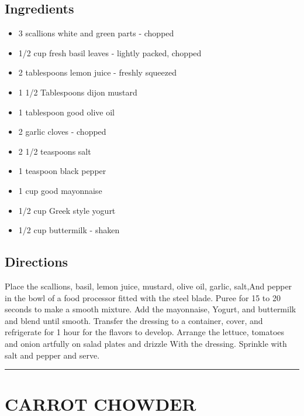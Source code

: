 \documentclass[
]{book}
\providecommand{\tightlist}{%
  \setlength{\itemsep}{0pt}\setlength{\parskip}{0pt}}
\begin{document}
\hypertarget{ingredients-16}{%
\subsection*{Ingredients}\label{ingredients-16}}


\begin{itemize}
\tightlist
\item
  3 scallions white and green parts - chopped
\item
  1/2 cup fresh basil leaves - lightly packed, chopped
\item
  2 tablespoons lemon juice - freshly squeezed
\item
  1 1/2 Tablespoons dijon mustard
\item
  1 tablespoon good olive oil
\item
  2 garlic cloves - chopped
\item
  2 1/2 teaspoons salt
\item
  1 teaspoon black pepper
\item
  1 cup good mayonnaise
\item
  1/2 cup Greek style yogurt
\item
  1/2 cup buttermilk - shaken
\end{itemize}

\hypertarget{directions-16}{%
\subsection*{Directions}\label{directions-16}}


Place the scallions, basil, lemon juice, mustard, olive oil, garlic, salt,And pepper in the bowl of a food processor fitted with the steel blade. Puree for 15 to 20 seconds to make a smooth mixture. Add the mayonnaise, Yogurt, and buttermilk and blend until smooth. Transfer the dressing to a container, cover, and refrigerate for 1 hour for the flavors to develop. Arrange the lettuce, tomatoes and onion artfully on salad plates and drizzle With the dressing. Sprinkle with salt and pepper and serve.

\begin{center}\rule{0.5\linewidth}{0.5pt}\end{center}

\hypertarget{carrot-chowder}{%
\section*{CARROT CHOWDER}\label{carrot-chowder}}
\end{document}

